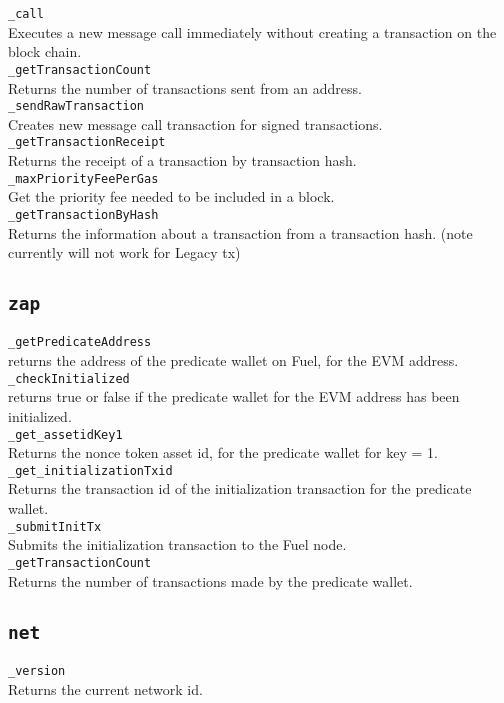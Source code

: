 \texttt{\_call}\\
Executes a new message call immediately without creating a transaction on the block chain.\\

\texttt{\_getTransactionCount}\\
Returns the number of transactions sent from an address.\\

\texttt{\_sendRawTransaction}\\
Creates new message call transaction for signed transactions.\\

\texttt{\_getTransactionReceipt}\\
Returns the receipt of a transaction by transaction hash. \\

\texttt{\_maxPriorityFeePerGas}\\
Get the priority fee needed to be included in a block.\\

\texttt{\_getTransactionByHash}\\
Returns the information about a transaction from a transaction hash. (note currently will not work for Legacy tx)\\


\subsection{\texttt{zap}}

\texttt{\_getPredicateAddress}\\
returns the address of the predicate wallet on Fuel, for the EVM address.\\

\texttt{\_checkInitialized}\\
returns true or false if the predicate wallet for the EVM address has been initialized.\\

\texttt{\_get\_assetidKey1}\\
Returns the nonce token asset id, for the predicate wallet for key = 1.\\

\texttt{\_get\_initializationTxid}\\
Returns the transaction id of the initialization transaction for the predicate wallet.\\

\texttt{\_submitInitTx}\\
Submits the initialization transaction to the Fuel node.\\

\texttt{\_getTransactionCount}\\
Returns the number of transactions made by the predicate wallet.\\

\subsection{\texttt{net}}

\texttt{\_version}\\
Returns the current network id.


